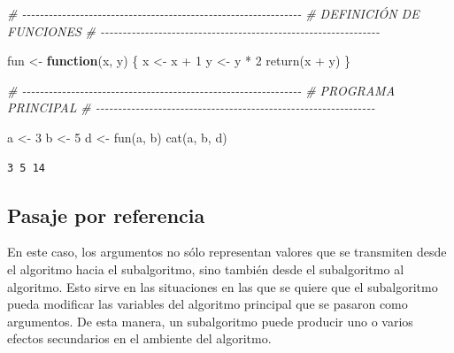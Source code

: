 \documentclass[
]{book}
\newenvironment{Shaded}{\begin{snugshade}}{\end{snugshade}}
\newcommand{\CommentTok}[1]{\textcolor[rgb]{0.56,0.35,0.01}{\textit{#1}}}
\newcommand{\ControlFlowTok}[1]{\textcolor[rgb]{0.13,0.29,0.53}{\textbf{#1}}}
\newcommand{\DecValTok}[1]{\textcolor[rgb]{0.00,0.00,0.81}{#1}}
\newcommand{\FunctionTok}[1]{\textcolor[rgb]{0.00,0.00,0.00}{#1}}
\newcommand{\NormalTok}[1]{#1}
\newcommand{\OtherTok}[1]{\textcolor[rgb]{0.56,0.35,0.01}{#1}}
\newcommand{\SpecialCharTok}[1]{\textcolor[rgb]{0.00,0.00,0.00}{#1}}
\begin{document}
\begin{Shaded}
\begin{Highlighting}[]
\CommentTok{\# {-}{-}{-}{-}{-}{-}{-}{-}{-}{-}{-}{-}{-}{-}{-}{-}{-}{-}{-}{-}{-}{-}{-}{-}{-}{-}{-}{-}{-}{-}{-}{-}{-}{-}{-}{-}{-}{-}{-}{-}{-}{-}{-}{-}{-}{-}{-}{-}{-}{-}{-}{-}{-}{-}{-}{-}{-}{-}{-}{-}{-}{-}{-}}
\CommentTok{\# DEFINICIÓN DE FUNCIONES}
\CommentTok{\# {-}{-}{-}{-}{-}{-}{-}{-}{-}{-}{-}{-}{-}{-}{-}{-}{-}{-}{-}{-}{-}{-}{-}{-}{-}{-}{-}{-}{-}{-}{-}{-}{-}{-}{-}{-}{-}{-}{-}{-}{-}{-}{-}{-}{-}{-}{-}{-}{-}{-}{-}{-}{-}{-}{-}{-}{-}{-}{-}{-}{-}{-}{-}}

\NormalTok{fun }\OtherTok{\textless{}{-}} \ControlFlowTok{function}\NormalTok{(x, y) \{}
\NormalTok{    x }\OtherTok{\textless{}{-}}\NormalTok{ x }\SpecialCharTok{+} \DecValTok{1}
\NormalTok{    y }\OtherTok{\textless{}{-}}\NormalTok{ y }\SpecialCharTok{*} \DecValTok{2}
    \FunctionTok{return}\NormalTok{(x }\SpecialCharTok{+}\NormalTok{ y)}
\NormalTok{\}}

\CommentTok{\# {-}{-}{-}{-}{-}{-}{-}{-}{-}{-}{-}{-}{-}{-}{-}{-}{-}{-}{-}{-}{-}{-}{-}{-}{-}{-}{-}{-}{-}{-}{-}{-}{-}{-}{-}{-}{-}{-}{-}{-}{-}{-}{-}{-}{-}{-}{-}{-}{-}{-}{-}{-}{-}{-}{-}{-}{-}{-}{-}{-}{-}{-}{-}}
\CommentTok{\# PROGRAMA PRINCIPAL}
\CommentTok{\# {-}{-}{-}{-}{-}{-}{-}{-}{-}{-}{-}{-}{-}{-}{-}{-}{-}{-}{-}{-}{-}{-}{-}{-}{-}{-}{-}{-}{-}{-}{-}{-}{-}{-}{-}{-}{-}{-}{-}{-}{-}{-}{-}{-}{-}{-}{-}{-}{-}{-}{-}{-}{-}{-}{-}{-}{-}{-}{-}{-}{-}{-}{-}}

\NormalTok{a }\OtherTok{\textless{}{-}} \DecValTok{3}
\NormalTok{b }\OtherTok{\textless{}{-}} \DecValTok{5}
\NormalTok{d }\OtherTok{\textless{}{-}} \FunctionTok{fun}\NormalTok{(a, b)}
\FunctionTok{cat}\NormalTok{(a, b, d)}
\end{Highlighting}
\end{Shaded}

\begin{verbatim}
3 5 14
\end{verbatim}

\hypertarget{pasaje-por-referencia}{%
\subsection{Pasaje por referencia}\label{pasaje-por-referencia}}

En este caso, los argumentos no sólo representan valores que se transmiten desde el algoritmo hacia el subalgoritmo, sino también desde el subalgoritmo al algoritmo. Esto sirve en las situaciones en las que se quiere que el subalgoritmo pueda modificar las variables del algoritmo principal que se pasaron como argumentos. De esta manera, un subalgoritmo puede producir uno o varios efectos secundarios en el ambiente del algoritmo.
\end{document}
